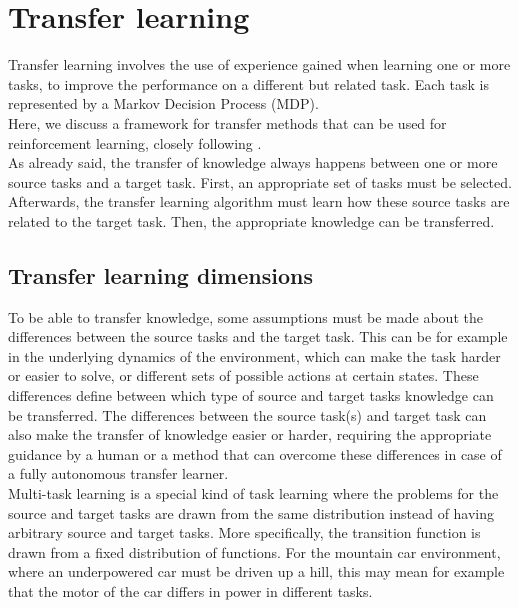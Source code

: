 \chapter{Transfer learning}
Transfer learning involves the use of experience gained when learning one or more tasks, to improve the performance on a different but related task. Each task is represented by a Markov Decision Process (MDP).\\  Here, we discuss a framework for transfer methods that can be used for reinforcement learning, closely following \cite{Taylor2009TransferSurvey}.\\

As already said, the transfer of knowledge always happens between one or more source tasks and a target task. First, an appropriate set of tasks must be selected. Afterwards, the transfer learning algorithm must learn how these source tasks are related to the target task. Then, the appropriate knowledge can be transferred.\\

\section{Transfer learning dimensions} %
\label{sub:transfer_learning_dimensions}
To be able to transfer knowledge, some assumptions must be made about the differences between the source tasks and the target task. This can be for example in the underlying dynamics of the environment, which can make the task harder or easier to solve, or different sets of possible actions at certain states.
These differences define between which type of source and target tasks knowledge can be transferred. The differences between the source task(s) and target task can also make the transfer of knowledge easier or harder, requiring the appropriate guidance by a human or a method that can overcome these differences in case of a fully autonomous transfer learner.\\
Multi-task learning is a special kind of task learning where the problems for the source and target tasks are drawn from the same distribution instead of having arbitrary source and target tasks. More specifically, the transition function is drawn from a fixed distribution of functions. For the mountain car environment, where an underpowered car must be driven up a hill, this may mean for example that the motor of the car differs in power in different tasks.\\

